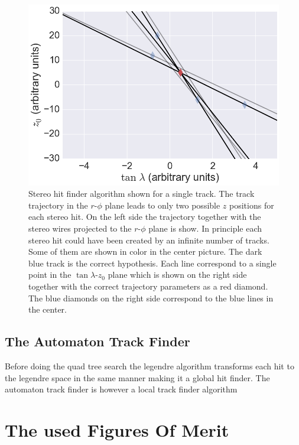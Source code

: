 \begin{figure}
 \includegraphics[scale=0.2]{figures/theory/stereo_3.png}
 \caption{Stereo hit finder algorithm shown for a single track. The track trajectory in the $r$-$\phi$ plane leads to only two possible $z$ positions for each stereo hit. On the left side the trajectory together with the stereo wires projected to the $r$-$\phi$ plane is show. In principle each stereo hit could have been created by an infinite number of tracks. Some of them are shown in color in the center picture. The dark blue track is the correct hypothesis. Each line correspond to a single point in the $\tan \lambda$-$z_0$ plane which is shown on the right side together with the correct trajectory parameters as a red diamond. The blue diamonds on the right side correspond to the blue lines in the center.}
 \label{fig-stereo-explained}
\end{figure}


\subsection{The Automaton Track Finder}
Before doing the quad tree search the legendre algorithm transforms each hit to the legendre space in the same manner making it a global hit finder. The automaton track finder is however a local track finder algorithm 



\section{The used Figures Of Merit}

